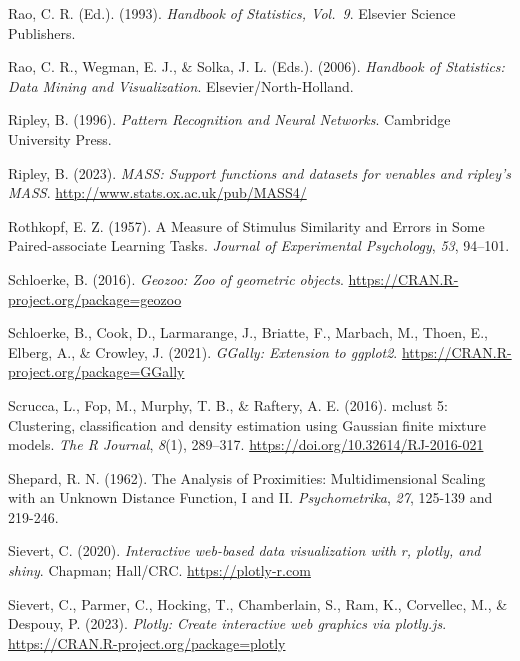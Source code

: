 \documentclass[
  letterpaper,
]{book}
\newlength{\cslhangindent}
\newlength{\cslentryspacingunit} %
\newenvironment{CSLReferences}[2] %
 {%
  \setlength{\parindent}{0pt}
  \ifodd #1
  \let\oldpar\par
  \def\par{\hangindent=\cslhangindent\oldpar}
  \fi
  \setlength{\parskip}{#2\cslentryspacingunit}
 }%
 {}
\begin{document}
\begin{CSLReferences}{1}{0}
\leavevmode{}%
Rao, C. R. (Ed.). (1993). \emph{{H}andbook of {S}tatistics, {V}ol.~9}.
Elsevier Science Publishers.

\leavevmode{}%
Rao, C. R., Wegman, E. J., \& Solka, J. L. (Eds.). (2006).
\emph{Handbook of {S}tatistics: {D}ata {M}ining and {V}isualization}.
Elsevier/North-Holland.

\leavevmode{}%
Ripley, B. (1996). \emph{Pattern {R}ecognition and {N}eural {N}etworks}.
Cambridge University Press.

\leavevmode{}%
Ripley, B. (2023). \emph{MASS: Support functions and datasets for
venables and ripley's MASS}. \url{http://www.stats.ox.ac.uk/pub/MASS4/}

\leavevmode{}%
Rothkopf, E. Z. (1957). A {M}easure of {S}timulus {S}imilarity and
{E}rrors in {S}ome {P}aired-associate {L}earning {T}asks. \emph{Journal
of Experimental Psychology}, \emph{53}, 94--101.

\leavevmode{}%
Schloerke, B. (2016). \emph{Geozoo: Zoo of geometric objects}.
\url{https://CRAN.R-project.org/package=geozoo}

\leavevmode{}%
Schloerke, B., Cook, D., Larmarange, J., Briatte, F., Marbach, M.,
Thoen, E., Elberg, A., \& Crowley, J. (2021). \emph{GGally: Extension to
ggplot2}. \url{https://CRAN.R-project.org/package=GGally}

\leavevmode{}%
Scrucca, L., Fop, M., Murphy, T. B., \& Raftery, A. E. (2016). {mclust}
5: Clustering, classification and density estimation using {G}aussian
finite mixture models. \emph{The {R} Journal}, \emph{8}(1), 289--317.
\url{https://doi.org/10.32614/RJ-2016-021}

\leavevmode{}%
Shepard, R. N. (1962). The {A}nalysis of {P}roximities:
{M}ultidimensional {S}caling with an {U}nknown {D}istance {F}unction,
{I} and {II}. \emph{Psychometrika}, \emph{27}, 125-139 and 219-246.

\leavevmode{}%
Sievert, C. (2020). \emph{Interactive web-based data visualization with
r, plotly, and shiny}. Chapman; Hall/CRC. \url{https://plotly-r.com}

\leavevmode{}%
Sievert, C., Parmer, C., Hocking, T., Chamberlain, S., Ram, K.,
Corvellec, M., \& Despouy, P. (2023). \emph{Plotly: Create interactive
web graphics via plotly.js}.
\url{https://CRAN.R-project.org/package=plotly}


\end{CSLReferences}
\end{document}
